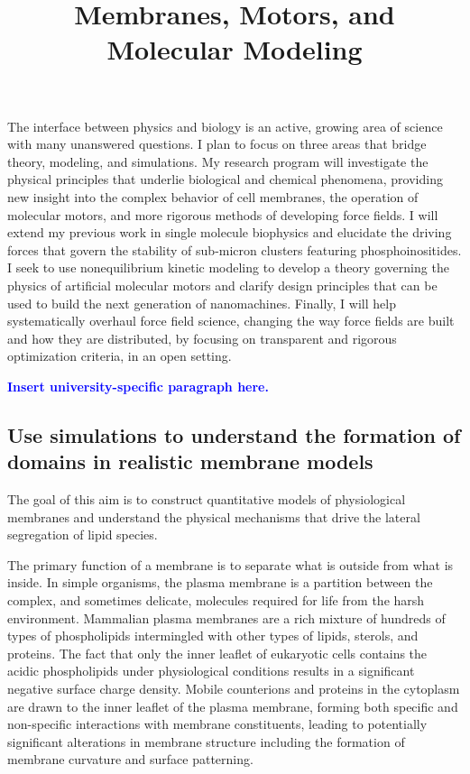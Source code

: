 \documentclass[11pt,notitlepage]{article}
\title{\large \vspace{-0.75in} \textbf{Membranes, Motors, and Molecular Modeling} \vspace{-1in} }
\date{}
\begin{document}

\maketitle
\thispagestyle{title}


The interface between physics and biology is an active, growing area of
science with many unanswered questions. I plan to focus on three areas
that bridge theory, modeling, and simulations. My research program will
investigate the physical principles that underlie biological and
chemical phenomena, providing new insight into the complex behavior of
cell membranes, the operation of molecular motors, and more rigorous
methods of developing force fields. I will extend my previous work in
single molecule biophysics and elucidate the driving forces that govern
the stability of sub-micron clusters featuring phosphoinositides. I seek
to use nonequilibrium kinetic modeling to develop a theory governing the
physics of artificial molecular motors and clarify design principles
that can be used to build the next generation of nanomachines. Finally,
I will help systematically overhaul force field science, changing the
way force fields are built and how they are distributed, by focusing on
transparent and rigorous optimization criteria, in an open setting.

\textcolor{blue}{\textbf{Insert university-specific paragraph here.}}

\hypertarget{use-simulations-to-understand-the-formation-of-domains-in-realistic-membrane-models}{%
\subsection{Use simulations to understand the formation of domains in
realistic membrane
models}\label{use-simulations-to-understand-the-formation-of-domains-in-realistic-membrane-models}}

{The goal of this aim is to construct quantitative models of
physiological membranes and understand the physical mechanisms that
drive the lateral segregation of lipid species.}

The primary function of a membrane is to separate what is outside from
what is inside. In simple organisms, the plasma membrane is a partition
between the complex, and sometimes delicate, molecules required for life
from the harsh environment. Mammalian plasma membranes are a rich
mixture of hundreds of types of phospholipids intermingled with other
types of lipids, sterols, and proteins. The fact that only the inner
leaflet of eukaryotic cells contains the acidic phospholipids under
physiological conditions results in a significant negative surface
charge density. Mobile counterions and proteins in the cytoplasm are
drawn to the inner leaflet of the plasma membrane, forming both specific
and non-specific interactions with membrane constituents, leading to
potentially significant alterations in membrane structure including the
formation of membrane curvature and surface patterning.
\end{document}
